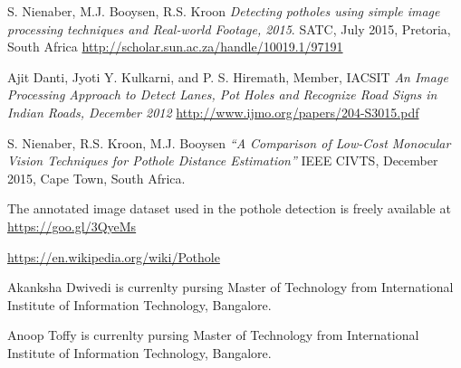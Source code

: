 \documentclass[journal]{IEEEtran}
\begin{document}
\begin{thebibliography}{1}

S. Nienaber, M.J. Booysen, R.S. Kroon
\textit{Detecting potholes using simple image processing techniques and Real-world Footage, 2015}. 
SATC, July 2015, Pretoria, South Africa
\url{http://scholar.sun.ac.za/handle/10019.1/97191}
 
Ajit Danti, Jyoti Y. Kulkarni, and P. S. Hiremath, Member, IACSIT
\textit{An Image Processing Approach to Detect Lanes, Pot Holes and Recognize Road Signs in Indian Roads, December 2012}
\url{http://www.ijmo.org/papers/204-S3015.pdf}

S. Nienaber, R.S. Kroon, M.J. Booysen  
\textit{“A Comparison of Low-Cost Monocular Vision Techniques for Pothole Distance Estimation”}
IEEE CIVTS, December 2015, Cape Town, South Africa.
 
The annotated image dataset used in the pothole detection is freely available at
\url{https://goo.gl/3QyeMs}

\url{https://en.wikipedia.org/wiki/Pothole}

\end{thebibliography}

\begin{IEEEbiography}{Akanksha Dwivedi}
is currenlty pursing Master of Technology from International Institute of Information Technology, Bangalore. 
\end{IEEEbiography}

\begin{IEEEbiography}{Anoop Toffy}
is currenlty pursing Master of Technology from International Institute of Information Technology, Bangalore. 
\end{IEEEbiography}
\end{document}
